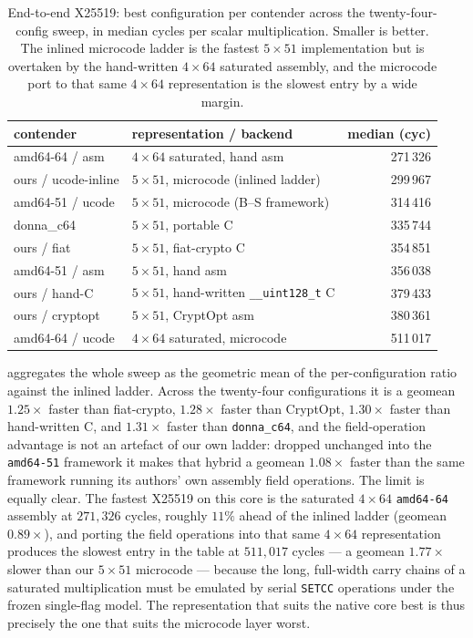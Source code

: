 \begin{table}[t]
\centering
\caption{End-to-end X25519: best configuration per contender across the
twenty-four-config sweep, in median cycles per scalar multiplication. Smaller is
better. The inlined microcode ladder is the fastest $5\times51$ implementation but
is overtaken by the hand-written $4\times64$ saturated assembly, and the microcode
port to that same $4\times64$ representation is the slowest entry by a wide margin.}
\label{tab:res-c25519-e2e}
\small
\begin{tabular}{@{}llr@{}}
\toprule
contender & representation / backend & median (cyc) \\
\midrule
amd64-64 / asm       & $4\times64$ saturated, hand asm                     & 271\,326 \\
ours / ucode-inline  & $5\times51$, microcode (inlined ladder)            & 299\,967 \\
amd64-51 / ucode     & $5\times51$, microcode (B--S framework)            & 314\,416 \\
donna\_c64           & $5\times51$, portable C                            & 335\,744 \\
ours / fiat          & $5\times51$, fiat-crypto C                         & 354\,851 \\
amd64-51 / asm       & $5\times51$, hand asm                              & 356\,038 \\
ours / hand-C        & $5\times51$, hand-written \texttt{\_\_uint128\_t} C & 379\,433 \\
ours / cryptopt      & $5\times51$, CryptOpt asm                          & 380\,361 \\
amd64-64 / ucode     & $4\times64$ saturated, microcode                   & 511\,017 \\
\bottomrule
\end{tabular}
\end{table}

 aggregates the whole sweep as the geometric mean of
the per-configuration ratio against the inlined ladder. Across the twenty-four
configurations it is a geomean $1.25\times$ faster than fiat-crypto, $1.28\times$
faster than CryptOpt, $1.30\times$ faster than hand-written C, and $1.31\times$
faster than \texttt{donna\_c64}, and the field-operation advantage is not an
artefact of our own ladder: dropped unchanged into the \texttt{amd64-51}
framework it makes that hybrid a geomean $1.08\times$ faster than the same
framework running its authors' own assembly field operations. The limit is
equally clear. The fastest X25519 on this core is the saturated $4\times64$
\texttt{amd64-64} assembly at $271{,}326$ cycles, roughly $11\%$ ahead of the
inlined ladder (geomean $0.89\times$), and porting the field operations into that
same $4\times64$ representation produces the slowest entry in the table at
$511{,}017$ cycles --- a geomean $1.77\times$ slower than our $5\times51$
microcode --- because the long, full-width carry chains of a saturated
multiplication must be emulated by serial \texttt{SETCC} operations under the
frozen single-flag model. The representation that suits the native core best is
thus precisely the one that suits the microcode layer worst.

